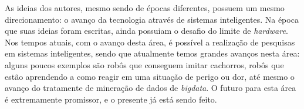 \documentclass[a4paper,11pt]{article}
\begin{document}
As ideias dos autores, mesmo sendo de épocas diferentes, possuem um mesmo direcionamento: o avanço da tecnologia através de sistemas inteligentes. Na época que suas ideias foram escritas, ainda possuiam o desafio do limite de \emph{hardware}. Nos tempos atuais, com o avanço desta área, é possível a realização de pesquisas em sistemas inteligentes, sendo que atualmente temos grandes avanços nesta área: alguns poucos exemplos são robôs que conseguem imitar cachorros, robôs que estão aprendendo a como reagir em uma situação de perigo ou dor, até mesmo o avanço do tratamente de mineração de dados de \emph{bigdata}. O futuro para esta área é extremamente promissor, e o presente já está sendo feito.
\end{document}
